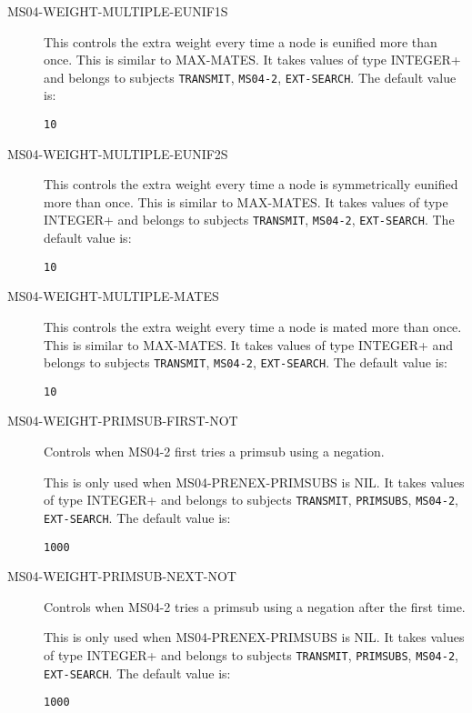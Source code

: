 \begin{description}
\item[MS04-WEIGHT-MULTIPLE-EUNIF1S]  
This controls the extra weight every time a node is eunified more than once.
This is similar to MAX-MATES.
It takes values of type INTEGER+ and belongs to subjects \texttt{TRANSMIT}, \texttt{MS04-2}, \texttt{EXT-SEARCH}.  The default value is: \begin{lstlisting}
10
\end{lstlisting}

\item[MS04-WEIGHT-MULTIPLE-EUNIF2S]  
This controls the extra weight every time a node is symmetrically eunified
more than once.  This is similar to MAX-MATES.
It takes values of type INTEGER+ and belongs to subjects \texttt{TRANSMIT}, \texttt{MS04-2}, \texttt{EXT-SEARCH}.  The default value is: \begin{lstlisting}
10
\end{lstlisting}

\item[MS04-WEIGHT-MULTIPLE-MATES]  
This controls the extra weight every time a node is mated more than once.
This is similar to MAX-MATES.
It takes values of type INTEGER+ and belongs to subjects \texttt{TRANSMIT}, \texttt{MS04-2}, \texttt{EXT-SEARCH}.  The default value is: \begin{lstlisting}
10
\end{lstlisting}

\item[MS04-WEIGHT-PRIMSUB-FIRST-NOT]  
Controls when MS04-2 first tries a primsub using a negation.

This is only used when MS04-PRENEX-PRIMSUBS is NIL.
It takes values of type INTEGER+ and belongs to subjects \texttt{TRANSMIT}, \texttt{PRIMSUBS}, \texttt{MS04-2}, \texttt{EXT-SEARCH}.  The default value is: \begin{lstlisting}
1000
\end{lstlisting}

\item[MS04-WEIGHT-PRIMSUB-NEXT-NOT]  
Controls when MS04-2 tries a primsub using a negation after the first time.

This is only used when MS04-PRENEX-PRIMSUBS is NIL.
It takes values of type INTEGER+ and belongs to subjects \texttt{TRANSMIT}, \texttt{PRIMSUBS}, \texttt{MS04-2}, \texttt{EXT-SEARCH}.  The default value is: \begin{lstlisting}
1000
\end{lstlisting}


\end{description}
